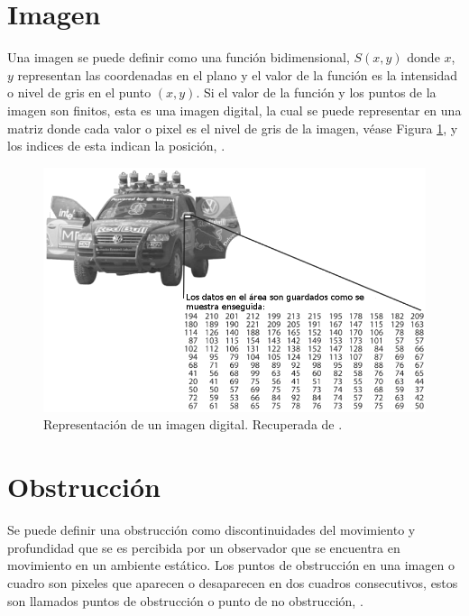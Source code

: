 \section{Imagen}\label{ImagenDef} 

Una imagen se puede definir como una función bidimensional, $S(x,y)$ donde $x$, $y$ representan las coordenadas en el plano y el valor de la función es la intensidad o nivel de gris en el punto $(x,y)$. 
Si el valor de la función y los puntos de la imagen son finitos, esta es una imagen digital, la cual se puede representar en una matriz donde cada valor o pixel es el nivel de gris de la imagen, véase Figura \ref{fig:image}, y los indices de esta indican la posición, \citep{Gonzalez2002}. 

\begin{figure}[h!]
\begin{center}
\includegraphics[scale=.50]{./Figures/image.png}
\end{center}
\caption{Representación de un imagen digital. Recuperada de \protect\citep{Shin2013}. }
\label{fig:image}
\end{figure}




\section{Obstrucción}\label{OclusionDef} 

Se puede definir una obstrucción como discontinuidades del movimiento y profundidad que se es percibida por un observador que se encuentra en movimiento en un ambiente estático.
Los puntos de obstrucción en una imagen o cuadro son pixeles que aparecen o desaparecen en dos cuadros consecutivos, estos son llamados puntos de obstrucción o punto de no obstrucción, \citep{Silva2001}.  


